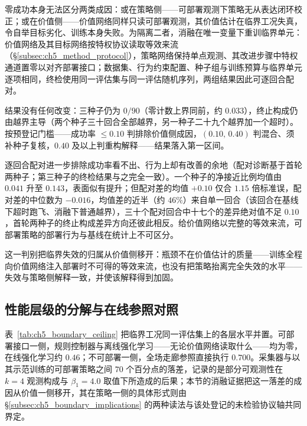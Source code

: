 零成功本身无法区分两类成因：或在策略侧——可部署观测下策略无从表达闭环校正；或在价值侧——价值网络同样只读可部署观测，其价值估计在临界工况失真，令自举目标劣化、训练本身失败。为隔离二者，消融在唯一变量下重训临界单元：价值网络及其目标网络按特权协议读取等效来流（\S\ref{subsec:ch5_method_protocol}），策略网络保持单点观测、其改进步骤中特权通道置零以对齐部署接口；数据集、行为约束配置、种子组与训练预算与临界单元逐项相同，终检使用同一评估集与同一评估随机序列，两组结果因此可逐回合配对。

结果没有任何改变：三种子仍为 $0/90$（零计数上界同前，约 $0.033$），终止构成仍由越界主导（两个种子三十回合全部越界，另一种子二十九个越界加一个超时）。按预登记门槛——成功率 $\le 0.10$ 判排除价值侧成因，$(0.10,\,0.40)$ 判混合、须补种子复核，$0.40$ 及以上判重构解释——结果落入第一区间。

逐回合配对进一步排除成功率看不出、行为上却有改善的余地（配对诊断基于首轮两种子；第三种子的终检结果与之完全一致）。一个种子的净接近比例均值由 $0.041$ 升至 $0.143$，表面似有提升；但配对差的均值 $+0.10$ 仅合 $1.15$ 倍标准误，配对差的中位数为 $-0.016$，均值差的近半（约 $46\%$）来自单一回合（该回合在基线下超时跑飞、消融下普通越界），三十个配对回合中十七个的差异绝对值不足 $0.10$，首轮两种子的终止构成差异方向还彼此相反。给价值网络以完整的等效来流，可部署策略的部署行为与基线在统计上不可区分。

这一判别把临界失效的归属从价值侧移开：瓶颈不在价值估计的质量——训练全程向价值网络注入部署时不可得的等效来流，也没有把策略抬离完全失效的水平——失效与策略侧解释一致，并使该解释得到加固。

\subsection{性能层级的分解与在线参照对照}\label{subsec:ch5_boundary_ceiling}

表~\ref{tab:ch5_boundary_ceiling} 把临界工况同一评估集上的各层水平并置。可部署接口一侧，规则控制器与离线强化学习——无论价值网络读取什么——均为零，在线强化学习约 $0.46$；不可部署一侧，全场走廊参照直接执行 $0.700$。采集器与以其示范训练的可部署策略之间 $70$ 个百分点的落差，记录的是部分可观测性在 $k=4$ 观测构成与 $\beta_1=4.0$ 取值下所造成的后果；本节的消融证据把这一落差的成因从价值一侧移开，其在策略一侧的具体形式则由 \S\ref{subsec:ch5_boundary_implications} 的两种读法与该处登记的未检验协议轴共同界定。

